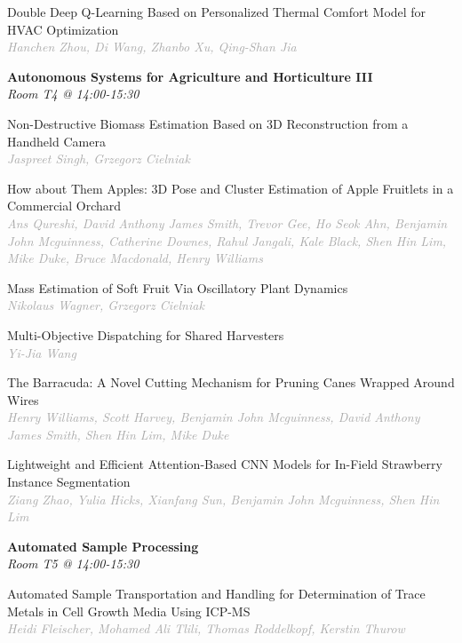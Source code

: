 \begin{multicols*}{2}
\small Double Deep Q-Learning Based on Personalized Thermal Comfort Model for HVAC Optimization\\ 
\footnotesize \textcolor{darkgray}{\textit{Hanchen Zhou, Di  Wang, Zhanbo  Xu, Qing-Shan  Jia}}

\normalsize \textbf{Autonomous Systems for Agriculture and Horticulture III}\\
\small \textit{Room T4 @ 14:00-15:30}

\small Non-Destructive Biomass Estimation Based on 3D Reconstruction from a Handheld Camera\\ 
\footnotesize \textcolor{darkgray}{\textit{Jaspreet Singh, Grzegorz  Cielniak}}

\small How about Them Apples: 3D Pose and Cluster Estimation of Apple Fruitlets in a Commercial Orchard\\ 
\footnotesize \textcolor{darkgray}{\textit{Ans Qureshi, David Anthony James  Smith, Trevor  Gee, Ho Seok  Ahn, Benjamin John  Mcguinness, Catherine  Downes, Rahul  Jangali, Kale  Black, Shen Hin  Lim, Mike  Duke, Bruce  Macdonald, Henry  Williams}}

\small Mass Estimation of Soft Fruit Via Oscillatory Plant Dynamics\\ 
\footnotesize \textcolor{darkgray}{\textit{Nikolaus Wagner, Grzegorz  Cielniak}}

\small Multi-Objective Dispatching for Shared Harvesters\\ 
\footnotesize \textcolor{darkgray}{\textit{Yi-Jia Wang}}

\small The Barracuda: A Novel Cutting Mechanism for Pruning Canes Wrapped Around Wires\\ 
\footnotesize \textcolor{darkgray}{\textit{Henry Williams, Scott  Harvey, Benjamin John  Mcguinness, David Anthony James  Smith, Shen Hin  Lim, Mike  Duke}}

\small Lightweight and Efficient Attention-Based CNN Models for In-Field Strawberry Instance Segmentation\\ 
\footnotesize \textcolor{darkgray}{\textit{Ziang Zhao, Yulia  Hicks, Xianfang  Sun, Benjamin John  Mcguinness, Shen Hin  Lim}}

\normalsize \textbf{Automated Sample Processing}\\
\small \textit{Room T5 @ 14:00-15:30}

\small Automated Sample Transportation and Handling for Determination of Trace Metals in Cell Growth Media Using ICP-MS\\ 
\footnotesize \textcolor{darkgray}{\textit{Heidi Fleischer, Mohamed Ali  Tlili, Thomas  Roddelkopf, Kerstin  Thurow}}


\end{multicols*}
